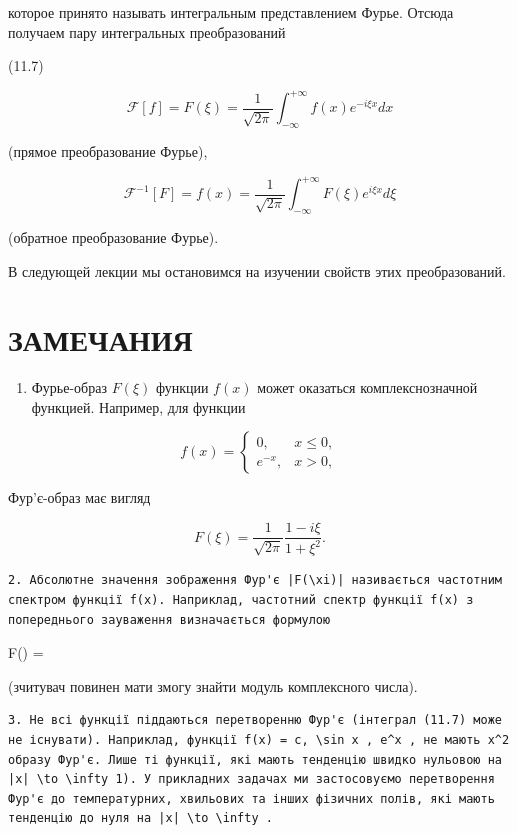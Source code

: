 \documentclass[
  ukrainian,
]{article}
\providecommand{\tightlist}{%
  \setlength{\itemsep}{0pt}\setlength{\parskip}{0pt}}
\begin{document}
которое принято называть интегральным представлением Фурье. Отсюда
получаем пару интегральных преобразований

(11.7)

\[
\mathcal{F}[f] = F(\xi) = \frac{1}{\sqrt{2\pi}} \int_{-\infty}^{+\infty} f(x) e^{-i\xi x} dx
\]

(прямое преобразование Фурье),

\[
\mathcal{F}^{-1}[F] = f(x) = \frac{1}{\sqrt{2\pi}} \int_{-\infty}^{+\infty} F(\xi) e^{i\xi x} d\xi
\]

(обратное преобразование Фурье).

В следующей лекции мы остановимся на изучении свойств этих
преобразований.

\section{ЗАМЕЧАНИЯ}\label{ux437ux430ux43cux435ux447ux430ux43dux438ux44f}

\begin{enumerate}
\def\labelenumi{\arabic{enumi}.}
\tightlist
\item
  Фурье-образ \(F(\xi)\) функции \(f(x)\) может оказаться
  комплекснозначной функцией. Например, для функции
\end{enumerate}

\[
f(x) =
\begin{cases} 0, & x \le 0, \\ e^{-x}, & x > 0, \end{cases}
\]

Фур'є-образ має вигляд

\[
F(\xi) = \frac{1}{\sqrt{2\pi}} \frac{1 - i\xi}{1 + \xi^2}.
\]

\begin{verbatim}
2. Абсолютне значення зображення Фур'є |F(\xi)| називається частотним спектром функції f(x). Наприклад, частотний спектр функції f(x) з попереднього зауваження визначається формулою
\end{verbatim}

\textbar F(\xi)\textbar{} = 

(зчитувач повинен мати змогу знайти модуль комплексного числа).

\begin{verbatim}
3. Не всі функції піддаються перетворенню Фур'є (інтеграл (11.7) може не існувати). Наприклад, функції f(x) = c, \sin x , e^x , не мають x^2 образу Фур'є. Лише ті функції, які мають тенденцію швидко нульовою на |x| \to \infty 1). У прикладних задачах ми застосовуємо перетворення Фур'є до температурних, хвильових та інших фізичних полів, які мають тенденцію до нуля на |x| \to \infty .
\end{verbatim}
\end{document}
